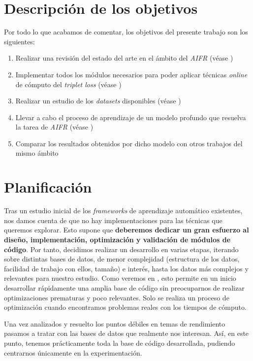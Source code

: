 \section{Descripción de los objetivos}

Por todo lo que acabamos de comentar, los objetivos del presente trabajo son los siguientes:

\begin{enumerate}
    \item Realizar una revisión del estado del arte en el ámbito del \textit{AIFR} (véase )
    \item Implementar todos los módulos necesarios para poder aplicar técnicas \textit{online} de cómputo del \textit{triplet loss} (véase )
    \item Realizar un estudio de los \textit{datasets} disponibles (véase )
    \item Llevar a cabo el proceso de aprendizaje de un modelo profundo que resuelva la tarea de \textit{AIFR} (véase )
    \item Comparar los resultados obtenidos por dicho modelo con otros trabajos del mismo ámbito
\end{enumerate}

\section{Planificación} \label{isec:planificacion}

Tras un estudio inicial de los \textit{frameworks} de aprendizaje automático existentes, nos damos cuenta de que no hay implementaciones para las técnicas que queremos explorar. Esto supone que \textbf{deberemos dedicar un gran esfuerzo al diseño, implementación, optimización y validación de módulos de código}. Por tanto, decidimos realizar un desarrollo en varias etapas, iterando sobre distintas bases de datos, de menor complejidad (estructura de los datos, facilidad de trabajo con ellos, tamaño) e interés, hasta los datos más complejos y relevantes para nuestro estudio. Como veremos en , esto permite en un inicio desarrollar rápidamente una amplia base de código sin preocuparnos de realizar optimizaciones prematuras y poco relevantes. Solo se realiza un proceso de optimización cuando encontramos problemas reales con los tiempos de cómputo.

Una vez analizados y resuelto los puntos débiles en temas de rendimiento pasamos a tratar con las bases de datos que realmente nos interesan. Así, en este punto, tenemos prácticamente toda la base de código desarrollada, pudiendo centrarnos únicamente en la experimentación.


